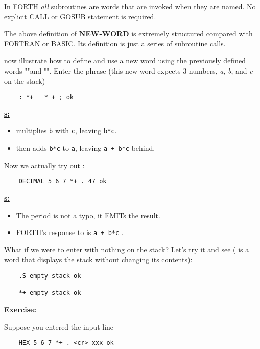In FORTH \textit{all} subroutines are words that are invoked when they are named. No explicit CALL or GOSUB statement is required.

The above definition of \textbf{NEW-WORD} is extremely structured compared with FORTRAN or BASIC. Its definition is just a series of subroutine calls.

 now illustrate how to define and use a new word using the previously defined words "\bc{:}"and "\bc{;}". Enter the phrase (this new word \bc{*+} expects 3 numbers, \textit{a}, \textit{b}, and \textit{c} on the stack)

\begin{lstlisting}
    : *+   * + ; ok
\end{lstlisting}

\Note \underline{\textbf{s:}}
\begin{itemize}
    \item \bc{*} multiplies \verb|b| with \verb|c|, leaving \verb|b*c|.
    \item \bc{+} then adds \verb|b*c| to \verb|a|, leaving \verb|a + b*c| behind.
\end{itemize}

Now we actually try out \bc{*+} :

\begin{lstlisting}
    DECIMAL 5 6 7 *+ . 47 ok
\end{lstlisting}

\Note \underline{\textbf{s:}}
\begin{itemize}
    \item The period  is not a typo, it EMITs the result.
    \item FORTH's response to  is \verb|a + b*c| .
\end{itemize}

What if we were to enter \bc{*+} with nothing on the stack? Let's try it and see ( is a word that displays the stack without changing its contents):

\begin{lstlisting}
    .S empty stack ok

    *+ empty stack ok
\end{lstlisting}


\underline{\textbf{Exercise:}}

Suppose you entered the input line

\begin{lstlisting}
    HEX 5 6 7 *+ . <cr> xxx ok
\end{lstlisting}

